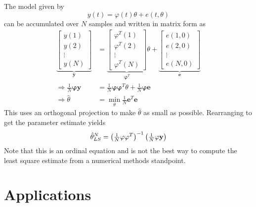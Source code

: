 The model given by
$$y(t) = \varphi(t)\theta + e(t,\theta)$$
can be accumulated over $N$ samples and written in matrix form as
\begin{align*}
\underbrace{\left[\begin{array}{c} y(1) \\ y(2) \\ \vdots \\ y(N) \end{array}\right]}_{\mathbf{y}} &= \underbrace{\left[\begin{array}{c} \varphi^T(1) \\ \varphi^T(2) \\ \vdots \\ \varphi^T(N) \end{array}\right]}_{\mathbf{\varphi}^T} \theta
+ \underbrace{\left[\begin{array}{c} e(1,0) \\ e(2,0) \\ \vdots \\ e(N,0) \end{array}\right]}_{\mathbf{e}} \\
\Rightarrow \tfrac{1}{N}\mathbf{\varphi}\mathbf{y} &= \tfrac{1}{N}\mathbf{\varphi}\mathbf{\varphi}^T\theta + \tfrac{1}{N}\mathbf{\varphi}\mathbf{e} \\
\Rightarrow \hat{\theta} &= \min_\theta \tfrac{1}{N}\mathbf{e}^T\mathbf{e}
\end{align*}
This uses an orthogonal projection to make $\hat{\theta}$ as small as possible.
Rearranging to get the parameter estimate yields
$$\hat{\theta}_{LS}^N = {\left(\tfrac{1}{N}\mathbf{\varphi\varphi}^T\right)}^{-1} \left(\tfrac{1}{N}\mathbf{\varphi y}\right)$$
Note that this is an ordinal equation and is not the best way to compute the least square estimate from a numerical methods standpoint.

\section{Applications}

